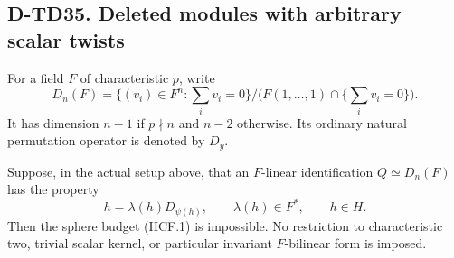 \subsection*{D-TD35. Deleted modules with arbitrary scalar twists}

For a field $F$ of characteristic $p$, write
\[
 D_n(F)=\{(v_i)\in F^n:\sum_i v_i=0\}
       \big/\bigl(F(1,\ldots,1)\cap\{\sum_i v_i=0\}\bigr).
 \tag{HCF.8}
\]
It has dimension $n-1$ if $p\nmid n$ and $n-2$ otherwise.
Its ordinary natural permutation operator is denoted by $D_y$.

\begin{lemma}[D-TD35]
Suppose, in the actual setup above, that an $F$-linear identification
$Q\simeq D_n(F)$ has the property
\[
                    h=\lambda(h)D_{\psi(h)},\qquad
                    \lambda(h)\in F^*,\qquad h\in H.
 \tag{HCF.9}
\]
Then the sphere budget (HCF.1) is impossible.
No restriction to characteristic two, trivial scalar kernel, or
particular invariant $F$-bilinear form is imposed.
\end{lemma}

